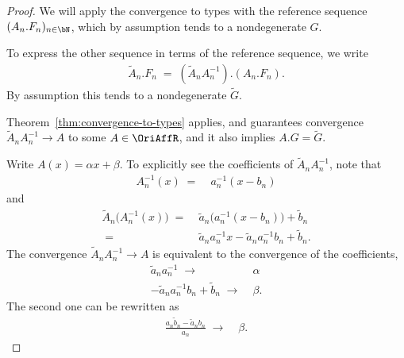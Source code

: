 \begin{proof}
  We will apply the convergence to types with the reference sequence
  $(A_n.F_n)_{n \in \bN}$, which by assumption tends to a
  nondegenerate $G$.

  To express the other sequence in terms of the reference sequence, we write
  \begin{align*}
    \widetilde{A}_n.F_n \; = \; (\widetilde{A}_n A_n^{-1}).(A_n.F_n) .
  \end{align*}
  By assumption this tends to a nondegenerate $\widetilde{G}$.

  Theorem~\ref{thm:convergence-to-types} applies, and guarantees convergence
  $\widetilde{A}_n A_n^{-1} \to A$ to some $A \in \OriAffR$,
  and it also implies $A.G = \widetilde{G}$.

  Write $A(x) = \alpha x + \beta$. To explicitly see the coefficients of
  $\widetilde{A}_n A_n^{-1}$, note that
  \begin{align*}
    A_n^{-1}(x) \; = \; & a_n^{-1} (x - b_n)
  \end{align*}
  and
  \begin{align*}
    \widetilde{A}_n \big( A_n^{-1}(x) \big)
    \; = \; & \tilde{a}_n \big(a_n^{-1} (x - b_n)\big) + \tilde{b}_n \\
    \; = \; & \tilde{a}_n a_n^{-1} x - \tilde{a}_n a_n^{-1} b_n + \tilde{b}_n .
  \end{align*}
  The convergence $\widetilde{A}_n A_n^{-1} \to A$ is equivalent to
  the convergence of the coefficients,
  \begin{align*}
    \tilde{a}_n a_n^{-1} \; \longrightarrow \; & \alpha \\
    - \tilde{a}_n a_n^{-1} b_n + \tilde{b}_n \; \longrightarrow \; & \beta .
  \end{align*}
  The second one can be rewritten as
  \begin{align*}
    \frac{a_n \tilde{b}_n - \tilde{a}_n b_n}{a_n} \; \longrightarrow \; & \beta .
  \end{align*}
\end{proof}

